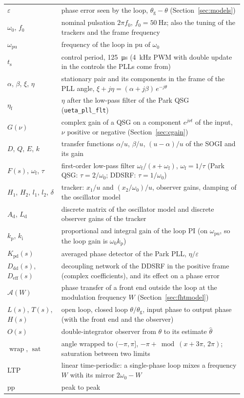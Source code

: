\documentclass[11pt,a4paper]{scrartcl}
\newcommand{\ped}[1]{_{\mathrm{#1}}}
\newcommand{\code}[1]{\texttt{#1}}
\newcommand{\sat}{\operatorname{sat}}
\newcommand{\wrapop}{\operatorname{wrap}}
\begin{document}
\begin{onehalfspace}
\begin{longtable}{@{} >{\raggedright\arraybackslash}p{0.22\linewidth} p{0.74\linewidth} @{}}
	$\varepsilon$ & phase error seen by the loop, $\theta\ped{g} - \theta$ (Section~\ref{sec:models}) \\
	$\omega_0$, $f_0$ & nominal pulsation $2\pi f_0$, $f_0 = \SI{50}{\hertz}$; also the tuning of the trackers and the frame frequency \\
	$\omega\ped{pu}$ & frequency of the loop in pu of $\omega_0$ \\
	$t\ped{s}$ & control period, \SI{125}{\micro\second} (\SI{4}{\kilo\hertz} PWM with double update in the controls the PLLs come from) \\
	$\alpha$, $\beta$, $\xi$, $\eta$ & stationary pair and its components in the frame of the PLL angle, $\xi + j\eta = (\alpha + j\beta)\,e^{-j\theta}$ \\
	$\eta\ped{f}$ & $\eta$ after the low-pass filter of the Park QSG (\code{ueta\_pll\_flt}) \\
	$G(\nu)$ & complex gain of a QSG on a component $e^{j\nu t}$ of the input, $\nu$ positive or negative (Section~\ref{sec:cgain}) \\
	$D$, $Q$, $E$, $k$ & transfer functions $\alpha/u$, $\beta/u$, $(u-\alpha)/u$ of the SOGI and its gain \\
	$F(s)$, $\omega\ped{f}$, $\tau$ & first-order low-pass filter $\omega\ped{f}/(s+\omega\ped{f})$, $\omega\ped{f} = 1/\tau$ (Park QSG: $\tau = 2/\omega_0$; DDSRF: $\tau = 1/\omega_0$) \\
	$H_1$, $H_2$, $l_1$, $l_2$, $\delta$ & tracker: $x_1/u$ and $(x_2/\omega_0)/u$, observer gains, damping of the oscillator model \\
	$A\ped{d}$, $L\ped{d}$ & discrete matrix of the oscillator model and discrete observer gains of the tracker \\
	$k\ped{p}$, $k\ped{i}$ & proportional and integral gain of the loop PI (on $\omega\ped{pu}$, so the loop gain is $\omega_0 k\ped{p}$) \\
	$K\ped{pd}(s)$ & averaged phase detector of the Park PLL, $\eta/\varepsilon$ \\
	$D\ped{dd}(s)$, $D\ped{eff}(s)$ & decoupling network of the DDSRF in the positive frame (complex coefficients), and its effect on a phase error \\
	$\mathcal{A}(W)$ & phase transfer of a front end outside the loop at the modulation frequency $W$ (Section~\ref{sec:fhtmodel}) \\
	$L(s)$, $T(s)$, $H(s)$ & open loop, closed loop $\theta/\theta\ped{g}$, input phase to output phase (with the front end and the observer) \\
	$O(s)$ & double-integrator observer from $\theta$ to its estimate $\hat\theta$ \\
	$\wrapop$, $\sat$ & angle wrapped to $(-\pi, \pi]$, $-\pi + \bmod(x + 3\pi,\, 2\pi)$; saturation between two limits \\
	LTP & linear time-periodic: a single-phase loop mixes a frequency $W$ with its mirror $2\omega_0 - W$ \\
	pp & peak to peak \\
\end{longtable}
\endgroup
\addtocounter{table}{-1}


\end{onehalfspace}
\end{document}
